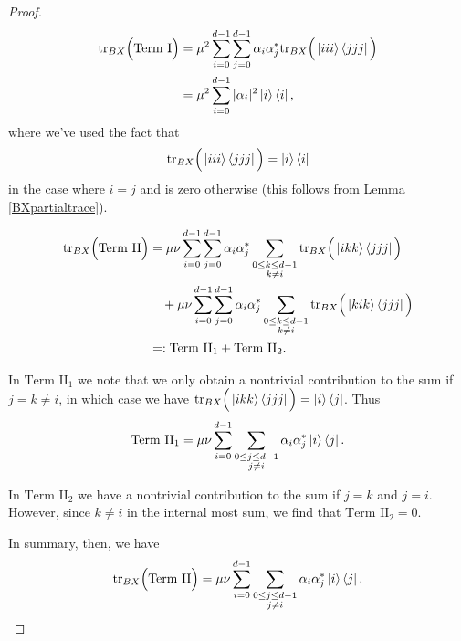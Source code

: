 \documentclass[reqno]{amsart}
\numberwithin{lemma}{section}
\numberwithin{proposition}{section}
\newcommand{\tr}{\textnormal{tr}}
\begin{document}
{\begin{proof}
\smallskip

\begin{align*}
\tr_{BX} \Big ( \text{Term I} \Big ) &= \mu^{2} \sum_{i=0}^{d-1} \sum_{j=0}^{d-1} \alpha_{i} \alpha_{j}^{*} \tr_{BX} \Big ( \ket{iii} \bra{jjj} \Big )\\
&= \mu^{2} \sum_{i=0}^{d-1} \vert \alpha_{i} \vert^{2} \ket{i} \bra{i},
\end{align*}
where we've used the fact that
\begin{equation*}
\tr_{BX} \Big ( \ket{iii} \bra{jjj} \Big ) = \ket{i} \bra{i}
\end{equation*}
in the case where $i = j$ and is zero otherwise (this follows from Lemma \ref{BXpartialtrace}).

\smallskip

\begin{align*}
\tr_{BX} \Big ( \textnormal{Term II} \Big ) &=
\mu \nu \sum_{i=0}^{d-1} \sum_{j=0}^{d-1} \alpha_{i} \alpha_{j}^{*} \sum_{\substack{0 \leq k \leq d-1\\ k \neq i}} \tr_{BX} \Big ( \ket{ikk}\bra{jjj} \Big )\\
& \quad + \mu \nu \sum_{i=0}^{d-1} \sum_{j=0}^{d-1} \alpha_{i} \alpha_{j}^{*} \sum_{\substack{0 \leq k \leq d-1\\ k \neq i}} \tr_{BX} \Big ( \ket{kik}\bra{jjj} \Big )\\
&=: \text{Term II}_{1} + \text{Term II}_{2}.
\end{align*}

In $\text{Term II}_{1}$ we note that we only obtain a nontrivial contribution to the sum if $j = k \neq i$, in which case we have $\tr_{BX} \Big ( \ket{ikk} \bra{jjj} \Big ) = \ket{i} \bra{j}$. Thus
\begin{align*}
\text{Term II}_{1} = \mu \nu \sum_{i=0}^{d-1} \sum_{\substack{0 \leq j \leq d-1\\ j \neq i}} \alpha_{i} \alpha_{j}^{*} \ket{i}\bra{j}.
\end{align*}

In $\text{Term II}_{2}$ we have a nontrivial contribution to the sum if $j = k$ and $j = i$. However, since $k \neq i$ in the internal most sum, we find that $\text{Term II}_{2} = 0.$

In summary, then, we have
\begin{equation*}
\tr_{BX} \Big ( \text{Term II} \Big ) = \mu \nu \sum_{i=0}^{d-1} \sum_{\substack{0 \leq j \leq d-1\\ j \neq i}} \alpha_{i} \alpha_{j}^{*} \ket{i}\bra{j}.
\end{equation*}


\end{proof}}
\end{document}
